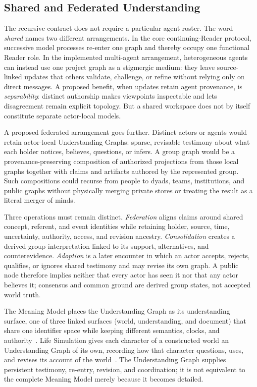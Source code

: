 \subsection{Shared and Federated Understanding}
\label{sec:federated}

The recursive contract does not require a particular agent roster. The word \emph{shared} names two different arrangements. In the core continuing-Reader protocol, successive model processes re-enter one graph and thereby occupy one functional Reader role. In the implemented multi-agent arrangement, heterogeneous agents can instead use one project graph as a stigmergic medium: they leave source-linked updates that others validate, challenge, or refine without relying only on direct messages. A proposed benefit, when updates retain agent provenance, is \emph{separability}: distinct authorship makes viewpoints inspectable and lets disagreement remain explicit topology. But a shared workspace does not by itself constitute separate actor-local models.

A proposed federated arrangement goes further. Distinct actors or agents would retain actor-local Understanding Graphs: sparse, revisable testimony about what each holder notices, believes, questions, or infers. A group graph would be a provenance-preserving composition of authorized projections from those local graphs together with claims and artifacts authored by the represented group. Such compositions could recurse from people to dyads, teams, institutions, and public graphs without physically merging private stores or treating the result as a literal merger of minds.

Three operations must remain distinct. \emph{Federation} aligns claims around shared concept, referent, and event identities while retaining holder, source, time, uncertainty, authority, access, and revision ancestry. \emph{Consolidation} creates a derived group interpretation linked to its support, alternatives, and counterevidence. \emph{Adoption} is a later encounter in which an actor accepts, rejects, qualifies, or ignores shared testimony and may revise its own graph. A public node therefore implies neither that every actor has seen it nor that any actor believes it; consensus and common ground are derived group states, not accepted world truth.

The Meaning Model places the Understanding Graph as its understanding surface, one of three linked surfaces (world, understanding, and document) that share one identifier space while keeping different semantics, clocks, and authority~\cite{westerberg2026meaning}. Life Simulation gives each character of a constructed world an Understanding Graph of its own, recording how that character questions, uses, and revises its account of the world~\cite{westerberg2026lifesim}. The Understanding Graph supplies persistent testimony, re-entry, revision, and coordination; it is not equivalent to the complete Meaning Model merely because it becomes detailed.

